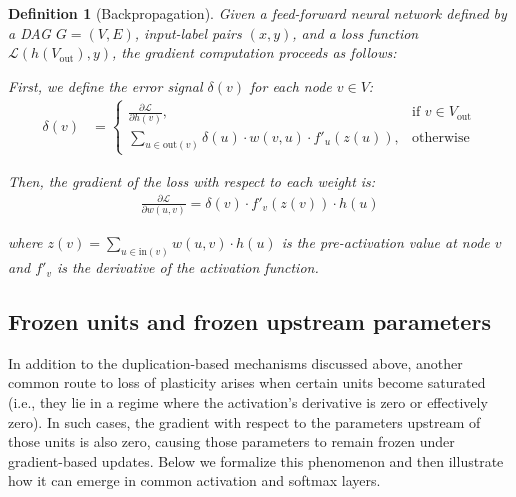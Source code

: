 \documentclass[11pt]{article}
\newtheorem{definition}{Definition}[section]
\begin{document}
\begin{definition}[Backpropagation]
    Given a feed-forward neural network defined by a DAG $G = (V, E)$, input-label pairs $(x, y)$, and a loss function $\mathcal{L}(h(V_{\text{out}}), y)$, the gradient computation proceeds as follows:
    
    First, we define the error signal $\delta(v)$ for each node $v \in V$:
    \begin{align}
        \delta(v) &= 
        \begin{cases}
            \frac{\partial \mathcal{L}}{\partial h(v)}, & \text{if } v \in V_{\text{out}} \\
            \sum_{u \in \text{out}(v)} \delta(u) \cdot w(v, u) \cdot f'_u(z(u)), & \text{otherwise}
        \end{cases}
    \end{align}
    
    Then, the gradient of the loss with respect to each weight is:
    \begin{align}
        \frac{\partial \mathcal{L}}{\partial w(u, v)} = \delta(v) \cdot f'_v(z(v)) \cdot h(u)
    \end{align}
    
    where $z(v) = \sum_{u \in \text{in}(v)} w(u, v) \cdot h(u)$ is the pre-activation value at node $v$ and $f'_v$ is the derivative of the activation function.
\end{definition}

\subsection{Frozen units and frozen upstream parameters}
In addition to the duplication-based mechanisms discussed above, another common route to loss of plasticity arises when certain units become saturated (i.e., they lie in a regime where the activation's derivative is zero or effectively zero). In such cases, the gradient with respect to the parameters upstream of those units is also zero, causing those parameters to remain frozen under gradient-based updates. Below we formalize this phenomenon and then illustrate how it can emerge in common activation and softmax layers.
\end{document}
